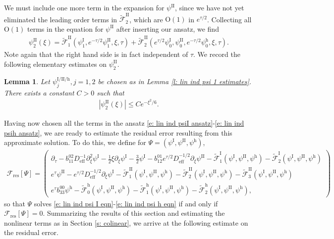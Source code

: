 \documentclass[11pt]{article}
\newcommand{\mcf}{\mathcal{F}}
\newtheorem{lemma}[prop]{Lemma}
\numberwithin{equation}{section}
\numberwithin{prop}{section}
\newcommand{\psih}{\psi^\mathrm{h}}
\newcommand{\Deff}{D_\mathrm{eff}}
\newcommand{\tfi}{\tilde{\mathcal{F}}^\mathrm{I}}
\newcommand{\tfii}{\tilde{\mathcal{F}}^\mathrm{II}}
\newcommand{\tfh}{\tilde{\mathcal{F}}^\mathrm{h}}
\newcommand{\psiI}{\psi^\mathrm{I}}
\newcommand{\psiII}{\psi^\mathrm{II}}
\begin{document}
We must include one more term in the expansion for $\psiII$, since we have not yet eliminated the leading order terms in $\tfii_2$, which are $\mathrm{O}(1)$ in $e^{\tau/2}$. Collecting all $\mathrm{O}(1)$ terms in the equation for $\psiII$ after inserting our ansatz, we find 
\begin{align}
\psiII_2 (\xi) = \tfii_1 (\psiI_1, e^{-\tau/2} \psiII_1, \xi, \tau) + \tfii_2 (e^{\tau/2} \psiI_0, \psiII_0, e^{-\tau/2} \psih_0, \xi, \tau). 
\end{align}
Note again that the right hand side is in fact independent of $\tau$. We record the following elementary estimates on $\psiII_2$.
\begin{lemma}\label{l: lin ind psiII 2 estimate}
	Let $\psi^\mathrm{I/II/h}_j, j = 1,2$ be chosen as in Lemma \ref{l: lin ind psi 1 estimates}. There exists a constant $C > 0$ such that 
	\begin{align}
	| \psiII_2 (\xi) | \leq C e^{-\xi^2 /6}. 
	\end{align}
\end{lemma}

Having now chosen all the terms in the ansatz \eqref{e: lin ind psiI ansatz}-\eqref{e: lin ind psih ansatz}, we are ready to estimate the residual error resulting from this approximate solution. To do this, we define for $\Psi = (\psiI, \psiII, \psih)$, 
\begin{align}
\mcf_\mathrm{res} [\Psi] = \begin{pmatrix}
\partial_\tau - b_{11}^{02} \Deff^{-1} \partial_\xi^2 \psiI - \frac{1}{2} \xi \partial_\xi \psiI - \frac{3}{2} \psiI - b_{12}^{01} e^{\tau/2} \Deff^{-1/2} \partial_\xi \psiII - \tfi_1 (\psiI, \psiII, \psih) - \tfi_2 (\psiI, \psiII, \psih) \\
e^\tau \psiII- e^{\tau/2} \Deff^{-1/2} \partial_\xi \psiI - \tfii_1 (\psiI, \psiII, \psih) - \tfii_2 (\psiI, \psiII, \psih) - \tfii_3 (\psiI, \psiII, \psih) \\
e^\tau b_{33}^{00} \psih - \tfh_0 (\psiI, \psiII, \psih) - \tfh_1 (\psiI, \psiII, \psih) - \tfh_2 (\psiI, \psiII, \psih),
\end{pmatrix}
\end{align}
so that $\Psi$ solves \eqref{e: lin ind psi I eqn}-\eqref{e: lin ind psi h eqn} if and only if $\mcf_\mathrm{res}[\Psi] = 0$. Summarizing the results of this section and estimating the nonlinear terms as in Section \ref{s: colinear}, we arrive at the following estimate on the residual error. 
\end{document}
